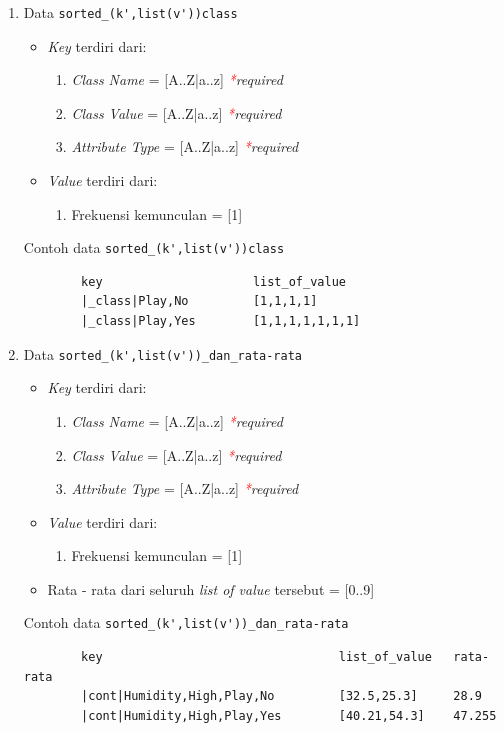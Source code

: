 \begin{enumerate}
	\item{Data \verb|sorted_(k',list(v'))class|}
	\begin{itemize}
		\item \textit{Key} terdiri dari:
		\begin{enumerate}
			\item \textit{Class Name} = [A..Z|a..z] \textit{\textcolor{red}{*}required}
			\item \textit{Class Value} = [A..Z|a..z] \textit{\textcolor{red}{*}required}
			\item \textit{Attribute Type} = [A..Z|a..z] \textit{\textcolor{red}{*}required}
		\end{enumerate}
		\item \textit{Value} terdiri dari:
		\begin{enumerate}
			\item Frekuensi kemunculan = [1]
		\end{enumerate}
	\end{itemize}
	Contoh data \verb|sorted_(k',list(v'))class|
	\begin{lstlisting}
		key						list_of_value
		|_class|Play,No			[1,1,1,1]
		|_class|Play,Yes		[1,1,1,1,1,1,1]
	\end{lstlisting}

	\item{Data \verb|sorted_(k',list(v'))_dan_rata-rata|}
	\begin{itemize}
		\item \textit{Key} terdiri dari:
		\begin{enumerate}
			\item \textit{Class Name} = [A..Z|a..z] \textit{\textcolor{red}{*}required}
			\item \textit{Class Value} = [A..Z|a..z] \textit{\textcolor{red}{*}required}
			\item \textit{Attribute Type} = [A..Z|a..z] \textit{\textcolor{red}{*}required}
		\end{enumerate}
		\item \textit{Value} terdiri dari:
		\begin{enumerate}
			\item Frekuensi kemunculan = [1]
		\end{enumerate}
		\item Rata - rata dari seluruh \textit{list of value} tersebut = [0..9]
	\end{itemize}
	Contoh data \verb|sorted_(k',list(v'))_dan_rata-rata|
	\begin{lstlisting}
		key									list_of_value	rata-rata
		|cont|Humidity,High,Play,No			[32.5,25.3]		28.9	
		|cont|Humidity,High,Play,Yes		[40.21,54.3]	47.255
	\end{lstlisting}


\end{enumerate}
